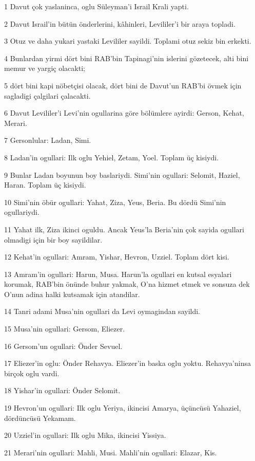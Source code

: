 \par 1 Davut çok yaslaninca, oglu Süleyman'i Israil Krali yapti.
\par 2 Davut Israil'in bütün önderlerini, kâhinleri, Levililer'i bir araya topladi.
\par 3 Otuz ve daha yukari yastaki Levililer sayildi. Toplami otuz sekiz bin erkekti.
\par 4 Bunlardan yirmi dört bini RAB'bin Tapinagi'nin islerini gözetecek, alti bini memur ve yargiç olacakti;
\par 5 dört bini kapi nöbetçisi olacak, dört bini de Davut'un RAB'bi övmek için sagladigi çalgilari çalacakti.
\par 6 Davut Levililer'i Levi'nin ogullarina göre bölümlere ayirdi: Gerson, Kehat, Merari.
\par 7 Gersonlular: Ladan, Simi.
\par 8 Ladan'in ogullari: Ilk oglu Yehiel, Zetam, Yoel. Toplam üç kisiydi.
\par 9 Bunlar Ladan boyunun boy baslariydi. Simi'nin ogullari: Selomit, Haziel, Haran. Toplam üç kisiydi.
\par 10 Simi'nin öbür ogullari: Yahat, Ziza, Yeus, Beria. Bu dördü Simi'nin ogullariydi.
\par 11 Yahat ilk, Ziza ikinci oguldu. Ancak Yeus'la Beria'nin çok sayida ogullari olmadigi için bir boy sayildilar.
\par 12 Kehat'in ogullari: Amram, Yishar, Hevron, Uzziel. Toplam dört kisi.
\par 13 Amram'in ogullari: Harun, Musa. Harun'la ogullari en kutsal esyalari korumak, RAB'bin önünde buhur yakmak, O'na hizmet etmek ve sonsuza dek O'nun adina halki kutsamak için atandilar.
\par 14 Tanri adami Musa'nin ogullari da Levi oymagindan sayildi.
\par 15 Musa'nin ogullari: Gersom, Eliezer.
\par 16 Gersom'un ogullari: Önder Sevuel.
\par 17 Eliezer'in oglu: Önder Rehavya. Eliezer'in baska oglu yoktu. Rehavya'ninsa birçok oglu vardi.
\par 18 Yishar'in ogullari: Önder Selomit.
\par 19 Hevron'un ogullari: Ilk oglu Yeriya, ikincisi Amarya, üçüncüsü Yahaziel, dördüncüsü Yekamam.
\par 20 Uzziel'in ogullari: Ilk oglu Mika, ikincisi Yissiya.
\par 21 Merari'nin ogullari: Mahli, Musi. Mahli'nin ogullari: Elazar, Kis.
